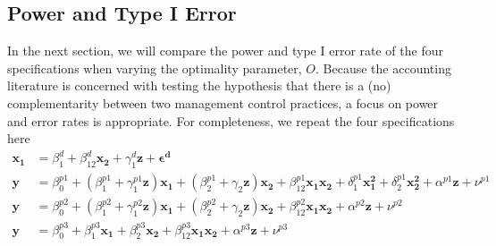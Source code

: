 \documentclass[12pt]{article}
\begin{document}
\subsection{Power and Type I Error}
In the next section, we will compare the power and type I error rate of the four specifications when varying the optimality parameter, $O$. Because the accounting literature is concerned with testing the hypothesis that there is a (no) complementarity between two management control practices, a focus on power and error rates is appropriate. For completeness, we repeat the four specifications here
\begin{align*} 
\mathbf{x_1} &= \beta_1^d + \beta_{12}^d \mathbf{x_2} 
        + \gamma_{1}^d \mathbf{z}
        + \mathbf{\epsilon^d} \\
\mathbf{y} &=  \beta^{p1}_0 + (\beta^{p1}_{1} + \gamma_1^{p1} \mathbf{z} )\mathbf{x_1} 
						+ (\beta_{2}^{p1} + \gamma_2 \mathbf{z} ) \mathbf{x_2} 
                        + \beta_{12}^{p1} \mathbf{x_1} \mathbf{x_2} 
                        + \delta_1^{p1} \mathbf{x^2_1} + \delta_2^{p1} \mathbf{x^2_2} 
                        + \alpha^{p1} \mathbf{z}
                        + \nu^{p1} \\
 \mathbf{y} &=  \beta^{p2}_0 + (\beta^{p2}_{1} + \gamma_1^{p2} \mathbf{z} )\mathbf{x_1} 
						+ (\beta_{2}^{p2} + \gamma_2 \mathbf{z} ) \mathbf{x_2} 
                        + \beta_{12}^{p2} \mathbf{x_1} \mathbf{x_2} 
                        + \alpha^{p2} \mathbf{z}
                        + \nu^{p2} \\
 \mathbf{y} &=  \beta^{p3}_0 + \beta^{p3}_{1} \mathbf{x_1} 
						+ \beta_{2}^{p3} \mathbf{x_2} 
                        + \beta_{12}^{p3} \mathbf{x_1} \mathbf{x_2} 
                        + \alpha^{p3} \mathbf{z}
                        + \nu^{p3}
\end{align*}
\end{document}
